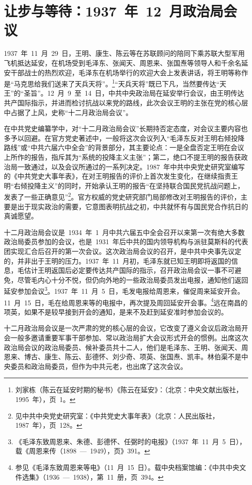 \section{让步与等待：1937~年~12~月政治局会议}

1937~年~11~月~29~日，王明、康生、陈云等在苏联顾问的陪同下乘苏联大型军用飞机抵达延安，在机场受到毛泽东、张闻天、周恩来、张国焘等领导人和千余名延安干部战士的热烈欢迎，毛泽东在机场举行的欢迎大会上发表讲话，将王明等称作是“马克思给我们送来了天兵天将”。\footnote{刘家栋（陈云在延安时期的秘书）《陈云在延安》：（北京：中央文献出版社，1995~年），页~1。}“天兵天将”既已下凡，当然要传达“天王”的“圣旨”。12~月~9~至~14~日，中共中央政治局在延安举行会议，由王明传达共产国际指示，并进而检讨抗战以来党的路线，此次会议王明的主张在党的核心层中占据了上风，史称“十二月政治局会议”。

在中共党史编纂学中，对“十二月政治局会议”长期持否定态度，对会议主要内容也多予以回避。在官方党史著述中，一般将这次会议列入“毛泽东反对王明右倾投降路线”或“中共六届六中全会”的背景部分，其主要论点：一是全盘否定王明在会议上所作的报告，指斥其为“系统的投降主义主张”；第二，绝口不提王明的报告获政治局一致通过，以及会议所通过的一系列决定。1987~年中共中央党史研究室编写的《中共党史大事年表》，在对王明报告的评价上首次发生变化，在继续指责王明“右倾投降主义”的同时，开始承认王明的报告“在坚持联合国民党抗战问题上，发表了一些正确意见”\footnote{见中共中央党史研究室：《中共党史大事年表》（北京：人民出版社，1987~年），页~128。}。官方权威的党史研究部门局部修改对王明报告的评价，主要是出于现实政治的需要，它意图表明抗战之初，中共就怀有与国民党合作抗日的真诚愿望。

十二月政治局会议是~1934~年~1~月中共六届五中全会召开以来第一次有绝大多数政治局委员参加的会议，也是~1931~年后中共的国内领导机构与派驻莫斯科的代表团实现汇合后召开的第一次会议。这次政治局会议的召开，是中共中央事先议定的，并非出于王明的压力。1937~年~11~月初，毛泽东就已知王明即将返国的信息，毛估计王明返国后必定要传达共产国际的指示，召开政治局会议一事不可避免，尽管毛内心十分不悦，但仍向外地的一些政治局委员发出电报，通知他们返回延安参加会议\footnote{《毛泽东致周恩来、朱德、彭德怀、任弼时的电报》（1937~年~11~月~5~日），载《周恩来传（1898~—~1949），页》391。}。1937~年~11~月~5~日，毛发电报给周恩来，催促周来延安开会。11~月~15~日，毛在给周恩来等的电报中，再次提及周回延安开会事。\footnote{参见《毛泽东致周恩来等电》（11~月~15~日）。载中央档案馆编：《中共中央文件选集》（1936~—~1938），第~11~册，页~394。}远在南昌的项英，如果不是较早接到开会的通知，是来不及赶到延安准时参加会议的。

十二月政治局会议是一次严肃的党的核心层的会议，它改变了遵义会议后政治局开会一般多邀请重要军事干部参加、常以政治局扩大会议形式开会的惯例。出席这次政治局会议的政治局委员、候补委员共十二人，他们是毛泽东、王明、张闻天、周恩来、博古、康生、陈云、彭德怀、刘少奇、项英、张国焘、凯丰。林伯渠不是中央委员和政治局委员，但作为中共元老，也出席了这次会议。

